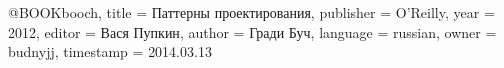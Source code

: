 
@BOOK{booch,
  title = {Паттерны проектирования},
  publisher = {O'Reilly},
  year = {2012},
  editor = {Вася Пупкин},
  author = {Гради Буч},
  language = {russian},
  owner = {budnyjj},
  timestamp = {2014.03.13}
}

